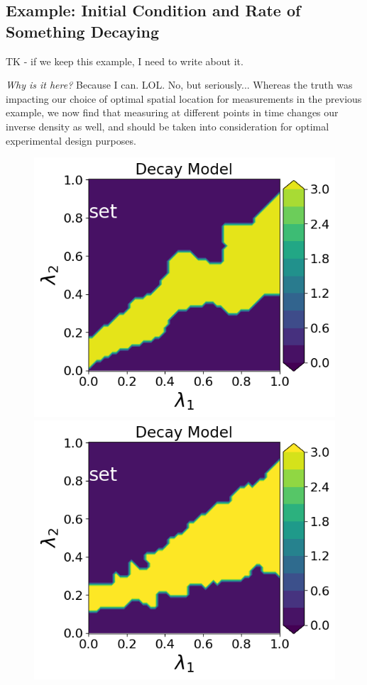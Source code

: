 \subsection{Example: Initial Condition and Rate of Something Decaying}\label{ex:decay-set-sample-accuracy}

TK - if we keep this example, I need to write about it.

\emph{Why is it here?}
Because I can. LOL. No, but seriously...
Whereas the truth was impacting our choice of optimal spatial location for measurements in the previous example, we now find that measuring at different points in time changes our inverse density as well, and should be taken into consideration for optimal experimental design purposes.

\begin{figure}[h]
\begin{minipage}{.4\textwidth}
\includegraphics[width=\linewidth]{examples/fig_decay_q1/DecayModel--set_N50_em.png}
\includegraphics[width=\linewidth]{examples/fig_decay_q1/DecayModel--set_N500_em.png}


\end{minipage}
\end{figure}
